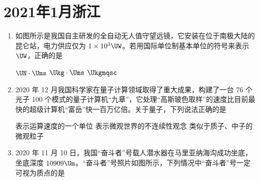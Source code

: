 \documentclass[\gkver]{gaokaozhenti}
\begin{document}
\chapter{2021年1月浙江}

\begin{enumerate}
\item
如图所示是我国自主研发的全自动无人值守望远镜，它安装在位于南极大陆的昆仑站，电力供应仅为 $1 \times 10^{3} \UW$。若用国际单位制基本单位的符号来表示 $\UW$，正确的是


\fourchoices[answer=D]
{$\UN \cdot \Us$}
{$\UN \cdot \Ums$}
{$\Ukg \cdot \Ums$}
{$\Ukgmqsc$}


\item
2020 年 12 月我国科学家在量子计算领域取得了重大成果，构建了一台 76 个光子 100 个模式的量子计算机“九章”，它处理“高斯玻色取样”的速度比目前最快的超级计算机“富岳”快一百万亿倍。关于量子，下列说法正确的是


{表示运算速度的一个单位}
{表示微观世界的不连续性观念}
{类似于质子、中子的微观粒子}


\item
2020 年 11 月 10 日，我国“奋斗者”号载人潜水器在马里亚纳海沟成功坐底，坐底深度 $10909 \Um$。“奋斗者”号照片如图所示，下列情况中“奋斗者”号一定可视为质点的是


\end{enumerate}
\end{document}

